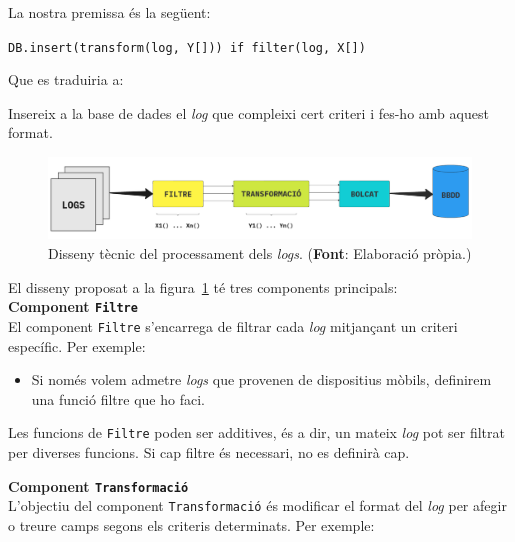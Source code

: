 \noindent
La nostra premissa és la següent:
\noindent
\begin{center}
    \texttt{DB.insert(transform(log, Y[])) if filter(log, X[])}
\end{center}

\noindent
Que es traduiria a:
\begin{center}
    Insereix a la base de dades el \textit{\gls{log}} que compleixi cert criteri i fes-ho amb aquest format.
\end{center}

\begin{figure}[htbp]
    \centerline{\includegraphics[width=1\textwidth]{figures/log-processing}}
    \captionsetup{justification=centering}
    \caption[Disseny tècnic del processament dels \textit{logs}.]{Disseny tècnic del processament dels \textit{logs}. (\textbf{Font}: Elaboració pròpia.)}\label{fig:log-processing}
\end{figure}

\noindent
El disseny proposat a la figura~\ref{fig:log-processing} té tres components principals: \\

\noindent
\textbf{Component \texttt{Filtre}} \\

\noindent
El component \texttt{Filtre} s’encarrega de filtrar cada \textit{\gls{log}} mitjançant un criteri específic.
Per exemple:
\begin{itemize}
    \item Si només volem admetre \textit{\gls{log}s} que provenen de dispositius mòbils, definirem una funció filtre que ho faci.
\end{itemize}

\noindent
Les funcions de \texttt{Filtre} poden ser additives, és a dir, un mateix \textit{\gls{log}} pot ser filtrat per diverses funcions.
Si cap filtre és necessari, no es definirà cap. \\

\clearpage

\noindent
\textbf{Component \texttt{Transformació}} \\

\noindent
L’objectiu del component \texttt{Transformació} és modificar el format del \textit{\gls{log}} per afegir o treure camps segons els criteris determinats.
Per exemple:

